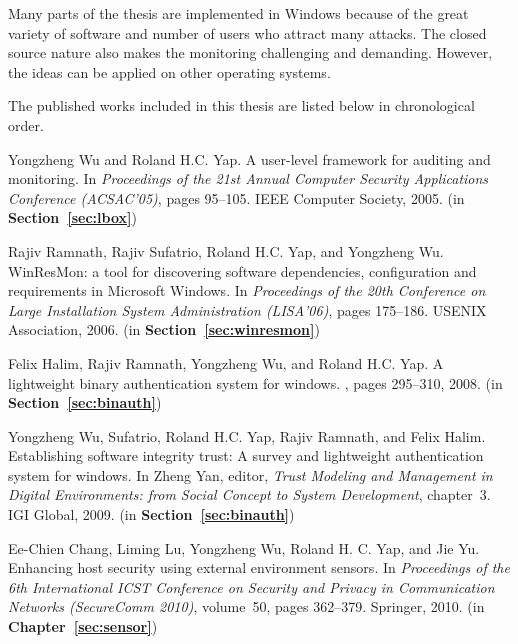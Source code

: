 Many parts of the thesis are implemented in Windows because of the great
variety of software and number of users who attract many attacks.
The closed source nature also makes the monitoring challenging and
demanding.
However, the ideas can be applied on other operating systems.

The published works included in this thesis are listed below in
chronological order.

\begin{tightenumerate}
\item
Yongzheng Wu and Roland H.C. Yap.
\newblock A user-level framework for auditing and monitoring.
\newblock In {\em Proceedings of the 21st Annual Computer Security Applications
  Conference (ACSAC'05)}, pages 95--105. IEEE Computer Society, 2005.
\newblock (in {\bf Section~\ref{sec:lbox}})

Rajiv Ramnath, Rajiv Sufatrio, Roland H.C. Yap, and Yongzheng Wu.
\newblock WinResMon: a tool for discovering software dependencies,
  configuration and requirements in Microsoft Windows.
\newblock In {\em Proceedings of the 20th Conference on Large Installation
  System Administration (LISA'06)}, pages 175--186. USENIX Association, 2006.
\newblock (in {\bf Section~\ref{sec:winresmon}})

\item
Felix Halim, Rajiv Ramnath, Yongzheng Wu, and Roland H.C. Yap.
\newblock A lightweight binary authentication system for windows.
, pages 295--310, 2008.
\newblock (in {\bf Section~\ref{sec:binauth}})

\item
Yongzheng Wu, Sufatrio, Roland H.C. Yap, Rajiv Ramnath, and Felix Halim.
\newblock Establishing software integrity trust: A survey and lightweight
  authentication system for windows.
\newblock In Zheng Yan, editor, {\em Trust Modeling and Management in Digital
  Environments: from Social Concept to System Development}, chapter~3. IGI
  Global, 2009.
\newblock (in {\bf Section~\ref{sec:binauth}})

\item
Ee-Chien Chang, Liming Lu, Yongzheng Wu, Roland H. C. Yap, and Jie Yu.
\newblock Enhancing host security using external environment sensors.
\newblock In {\em Proceedings of the 6th International ICST Conference on
  Security and Privacy in Communication Networks (SecureComm 2010)}, volume~50,
  pages 362--379. Springer, 2010.
\newblock (in {\bf Chapter~\ref{sec:sensor}})


\end{tightenumerate}
